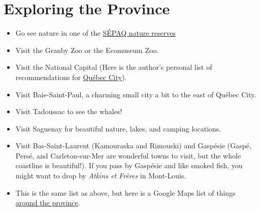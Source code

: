 \section{Exploring the Province}
\begin{itemize}
    \item Go see nature in one of the \href{https://www.sepaq.com/carte/index.dot?language_id=1}{SÉPAQ nature reserves }
    \item Visit the Granby Zoo or the Ecomuseum Zoo.
    \item Visit the National Capital (Here is the author's personal list of recommendations for \href{https://docs.google.com/document/d/17WaLQl0T-heW3wgH_kzgjfSy8mMwNQudzKE0SNTB6VA/edit?usp=sharing}{Québec City}).
    \item Visit Baie-Saint-Paul, a charming small city a bit to the east of Québec City.
    \item Visit Tadoussac to see the whales!
    \item Visit Saguenay for beautiful nature, lakes, and camping locations.
    \item Visit Bas-Saint-Laurent (Kamouraska and Rimouski) and Gaspésie (Gaspé, Persé, and Carleton-sur-Mer are wonderful towns to visit, but the whole coastline is beautiful!). If you pass by Gaspésie and like smoked fish, you might want to drop by \textit{Atkins et Frères} in Mont-Louis.
    \item This is the same list as above, but here is a Google Maps list of things \href{https://maps.app.goo.gl/NpDyFci6MpNeW9ef7}{around the province}.
\end{itemize}